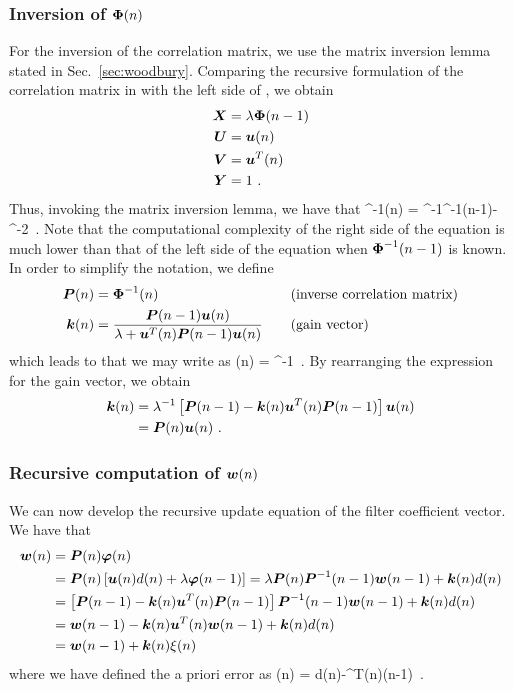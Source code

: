 \subsubsection{Inversion of $\boldsymbol{\Phi}(n)$}
For the inversion of the correlation matrix, we use the matrix inversion lemma stated in Sec.~\ref{sec:woodbury}. Comparing the recursive formulation of the correlation matrix in  with the left side of , we obtain
\begin{align}
  \boldsymbol{X} &= \lambda\boldsymbol{\Phi}(n-1)\\
  \boldsymbol{U} &= \boldsymbol{u}(n)\\
  \boldsymbol{V} &= \boldsymbol{u}^T(n)\\
  \boldsymbol{Y} &= 1\ .
\end{align}
Thus, invoking the matrix inversion lemma, we have that
\bmath
  \vect{\Phi}^{-1}(n) = \lambda^{-1}\vect{\Phi}^{-1}(n-1)-\lambda^{-2}\ .
  \label{eq:rls_inv_phi}
\emath
Note that the computational complexity of the right side of the equation is much lower than that of the left side of the equation when $\boldsymbol{\Phi}^{-1}(n-1)$ is known. In order to simplify the notation, we define
\begin{alignat}{2}
  \boldsymbol{P}(n) &= \boldsymbol{\Phi}^{-1}(n)&\quad&\text{(inverse correlation matrix)}\\
  \boldsymbol{k}(n) &= \frac{\boldsymbol{P}(n-1)\boldsymbol{u}(n)}{\lambda+\boldsymbol{u}^T(n)\boldsymbol{P}(n-1)\boldsymbol{u}(n)}&\quad&\text{(gain vector)}
\end{alignat}
which leads to that we may write  as
\bmath
  (n) = \lambda^{-1}\ .
\emath
By rearranging the expression for the gain vector, we obtain
\begin{align}
  \boldsymbol{k}(n) &= \lambda^{-1}\left[\boldsymbol{P}(n-1)-\boldsymbol{k}(n)\boldsymbol{u}^T(n)\boldsymbol{P}(n-1)\right] \boldsymbol{u}(n)\notag\\
  &= \boldsymbol{P}(n)\boldsymbol{u}(n)\ .
\end{align}

\subsubsection{Recursive computation of $\boldsymbol{w}(n)$}
We can now develop the recursive update equation of the filter coefficient vector. We have that
\begin{align}
  \boldsymbol{w}(n) &= \boldsymbol{P}(n)\boldsymbol{\varphi}(n)\\
  &= \boldsymbol{P}(n)\left[\boldsymbol{u}(n)d(n) + \lambda\boldsymbol{\varphi}(n-1)\right]=\lambda\boldsymbol{P}(n)\boldsymbol{P}^{-1}(n-1)\boldsymbol{w}(n-1)+\boldsymbol{k}(n)d(n)\notag\\
  &= \left[\boldsymbol{P}(n-1)-\boldsymbol{k}(n)\boldsymbol{u}^T(n)\boldsymbol{P}(n-1)\right]\boldsymbol{P}^{-1}(n-1)\boldsymbol{w}(n-1)+\boldsymbol{k}(n)d(n)\notag\\
  &= \boldsymbol{w}(n-1)-\boldsymbol{k}(n)\boldsymbol{u}^T(n)\boldsymbol{w}(n-1)+\boldsymbol{k}(n)d(n)\notag\\
  &= \boldsymbol{w}(n-1)+\boldsymbol{k}(n)\xi(n)
\end{align}
where we have defined the a priori error as
\bmath
  \xi(n) = d(n)-^T(n)(n-1)\ .
\emath

